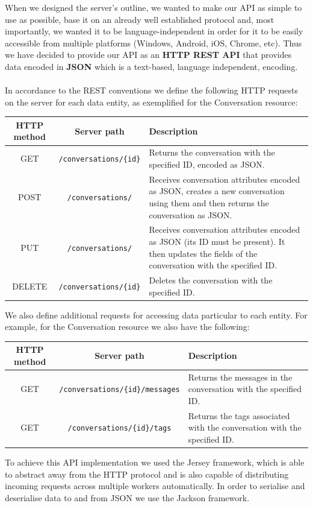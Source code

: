 \documentclass[12p, a4paper, onecolumn]{report}
\begin{document}
When we designed the server's outline, we wanted to make our API as simple to use as possible, base it on an already well established protocol and, most importantly, we wanted it to be language-independent in order for it to be easily accessible from multiple platforms (Windows, Android, iOS, Chrome, etc). Thus we have decided to provide our API as an \textbf{HTTP REST API} that provides data encoded in \textbf{JSON} which is a text-based, language independent, encoding. \\ \\
In accordance to the REST conventions we define the following HTTP requests on the server for each data entity, as exemplified for the Conversation resource:
\begin{center}
\begin{tabular}[c]{| c | c | L |}
\hline
\textbf{HTTP method} & \textbf{Server path} & \textbf{Description}\\
\hline
GET & \texttt{/conversations/\{id\}} & Returns the conversation with the specified ID, encoded as JSON.\\
\hline
POST & \texttt{/conversations/} & Receives conversation attributes encoded as JSON, creates a new conversation using them and then returns the conversation as JSON.\\
\hline
PUT & \texttt{/conversations/} & Receives conversation attributes encoded as JSON (its ID must be present). It then updates the fields of the conversation with the specified ID.\\
\hline
DELETE & \texttt{/conversations/\{id\}} & Deletes the conversation with the specified ID.\\
\hline
\end{tabular}
\end{center}
We also define additional requests for accessing data particular to each entity. For example, for the Conversation resource we also have the following:
\begin{center}
\begin{tabular}[c]{| c | c | F |}
\hline
\textbf{HTTP method} & \textbf{Server path} & \textbf{Description}\\
\hline
GET & \texttt{/conversations/\{id\}/messages} & Returns the messages in the conversation with the specified ID.\\
\hline
GET & \texttt{/conversations/\{id\}/tags} & Returns the tags associated with the conversation with the specified ID.\\
\hline
\end{tabular}
\end{center}
To achieve this API implementation we used the Jersey framework, which is able to abstract away from the HTTP protocol and is also capable of distributing incoming requests across multiple workers automatically. In order to serialise and deserialise data to and from JSON we use the Jackson framework.
\end{document}
